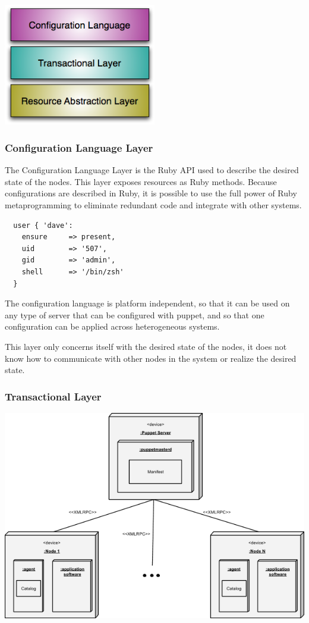 \documentclass[a4paper]{article}
\begin{document}
\begin{center}
\includegraphics[width=0.5\textwidth]{images/layers.png}
\end{center}

\subsubsection{Configuration Language Layer}

The Configuration Language Layer is the Ruby API used to describe the desired state of the nodes. This layer exposes resources as Ruby methods. Because configurations are described in Ruby, it is possible to use the full power of Ruby metaprogramming to eliminate redundant code and integrate with other systems.

\begin{verbatim}
  user { 'dave':
    ensure     => present,
    uid        => '507',
    gid        => 'admin',
    shell      => '/bin/zsh'
  }
\end{verbatim}

The configuration language is platform independent, so that it can be used on any type of server that can be configured with puppet, and so that one configuration can be applied across heterogeneous systems.

This layer only concerns itself with the desired state of the nodes, it does not know how to communicate with other nodes in the system or realize the desired state.

\subsubsection{Transactional Layer}

\begin{center}
\includegraphics[width=\textwidth]{images/transaction-layer.png}
\end{center}
\end{document}
